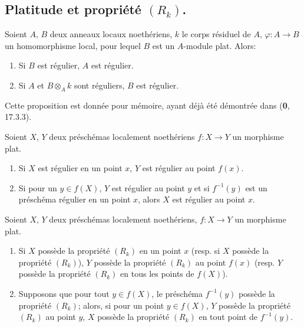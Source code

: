 \subsection{\texorpdfstring{Platitude et propriété $(R_k)$.}{Platitude et propriété (R\string_k)}}

\begin{proposition}[6.5.1]
Soient $A$, $B$ deux anneaux locaux noethériens, $k$ le corps résiduel
de $A$, $\varphi:A\to B$ un homomorphisme local, pour lequel $B$ est un
$A$-module plat. Alors:
\begin{enumerate}
\item[\textup{(i)}] Si $B$ est régulier, $A$ est régulier.
\item[\textup{(ii)}] Si $A$ et $B\otimes_Ak$ sont réguliers, $B$ est régulier.
\end{enumerate}
\end{proposition}

Cette proposition est donnée pour mémoire, ayant déjà été démontrée dans
(\textbf{0}, 17.3.3).

\begin{corollary}[6.5.2]
\label{IV.2.s6.5.2-fr}
Soient $X$, $Y$ deux préschémas localement noethériens $f:X\to Y$
un morphisme plat.
\begin{enumerate}
\item[\textup{(i)}] Si $X$ est régulier en un point $x$, $Y$ est régulier au point
$f(x)$.
\item[\textup{(ii)}] Si pour un $y\in f(X)$, $Y$ est régulier au point $y$ et si
$f^{-1}(y)$ est un préschéma régulier en un point $x$, alors $X$ est
régulier au point $x$.
\end{enumerate}
\end{corollary}

\begin{proposition}[6.5.3]
\label{IV.2.s6.5.3-fr}
Soient $X$, $Y$ deux préschémas localement noethériens, $f:X\to Y$
un morphisme plat.
\begin{enumerate}
\item[\textup{(i)}] Si $X$ possède la propriété $(R_k)$ en un point $x$
\textup{(resp.} si $X$ possède la propriété $(R_k)$), $Y$ possède la propriété
$(R_k)$ au point $f(x)$ \textup{(resp.} $Y$ possède la propriété $(R_k)$ en tous
les points de $f(X)$).
\item[\textup{(ii)}] Supposons que pour tout $y\in f(X)$, le préschéma
$f^{-1}(y)$ possède la propriété $(R_k)$; alors, si pour un point
$y\in f(X)$, $Y$ possède la propriété $(R_k)$ au point $y$, $X$ possède
la propriété $(R_k)$ en tout point de $f^{-1}(y)$.
\end{enumerate}
\end{proposition}

